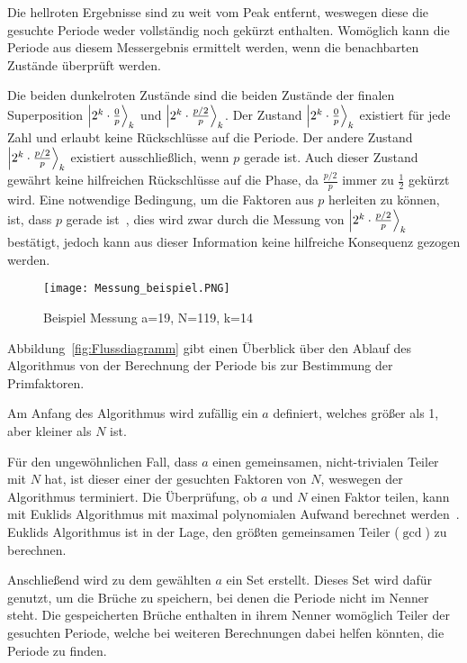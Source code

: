 Die hellroten Ergebnisse sind zu weit vom Peak entfernt,
weswegen diese die gesuchte Periode weder vollständig noch gekürzt enthalten.
Womöglich kann die Periode aus diesem Messergebnis ermittelt werden, 
wenn die benachbarten Zustände überprüft werden.

Die beiden dunkelroten Zustände sind die beiden Zustände der finalen Superposition
\(\ket{2^k \cdot \frac{0}{p}}_k\) und \(\ket{2^k \cdot \frac{p/2}{p}}_k\).
Der Zustand \(\ket{2^k \cdot \frac{0}{p}}_k\) existiert für jede Zahl und erlaubt keine 
Rückschlüsse auf die Periode.
Der andere Zustand \(\ket{2^k \cdot \frac{p/2}{p}}_k\) existiert ausschließlich, wenn \(p\) gerade ist.
Auch dieser Zustand gewährt keine hilfreichen Rückschlüsse auf die Phase, 
da \(\frac{p/2}{p}\) immer zu \(\frac{1}{2}\) gekürzt wird.
Eine notwendige Bedingung, um die Faktoren aus \(p\) herleiten zu können, 
ist, dass \(p\) gerade ist~\cite*{Shor_1997}, 
dies wird zwar durch die Messung von \(\ket{2^k \cdot \frac{p/2}{p}}_k\) bestätigt, 
jedoch kann aus dieser Information keine hilfreiche Konsequenz gezogen werden.

\begin{figure}[H]
  \centering
  \texttt{[image: Messung\_beispiel.PNG]}
  \caption{Beispiel Messung a=19, N=119, k=14}
  \label{fig:shor_measure}
\end{figure}


\bigskip

Abbildung~\ref{fig:Flussdiagramm} gibt einen Überblick über den Ablauf des Algorithmus 
von der Berechnung der Periode bis zur Bestimmung der Primfaktoren.

Am Anfang des Algorithmus wird zufällig ein \(a\) definiert, 
welches größer als 1, aber kleiner als \(N\) ist.

Für den ungewöhnlichen Fall, dass \(a\) einen gemeinsamen, nicht-trivialen Teiler mit \(N\) hat, 
ist dieser einer der gesuchten Faktoren von \(N\), 
weswegen der Algorithmus terminiert.
Die Überprüfung, ob \(a\) und \(N\) einen Faktor teilen, 
kann mit Euklids Algorithmus mit maximal polynomialen Aufwand berechnet werden~\cite[301]{homeister2023quantum215}. 
Euklids Algorithmus ist in der Lage, den größten gemeinsamen Teiler (\(\gcd\)) zu berechnen.

Anschließend wird zu dem gewählten \(a\) ein Set erstellt.
Dieses Set wird dafür genutzt, um die Brüche zu speichern, 
bei denen die Periode nicht im Nenner steht. 
Die gespeicherten Brüche enthalten in ihrem Nenner womöglich Teiler der gesuchten Periode, 
welche bei weiteren Berechnungen dabei helfen könnten, die Periode zu finden.

